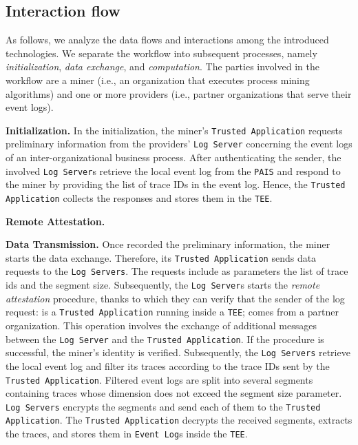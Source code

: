 \subsection{Interaction flow}
%

%
As follows, we analyze the data flows and interactions among the introduced technologies. We separate the workflow into subsequent processes, namely \textit{initialization}, \textit{data exchange}, and \textit{computation}.
The parties involved in the workflow are a miner (i.e., an organization that executes process mining algorithms) and one or more providers (i.e., partner organizations that serve their event logs). %

\textbf{Initialization.} In the initialization, the miner's \texttt{Trusted Application} requests preliminary information from the providers' \texttt{Log Server} concerning the event logs of an inter-organizational business process. After authenticating the sender, the involved \texttt{Log Server}s retrieve the local event log from the \texttt{PAIS} and respond to the miner by providing the list of trace IDs in the event log. Hence, the \texttt{Trusted Application} collects the responses and stores them in the \texttt{TEE}.

\textbf{Remote Attestation.} 

\textbf{Data Transmission.} Once recorded the preliminary information, the miner starts the data exchange. Therefore, its \texttt{Trusted Application} sends data requests to the \texttt{Log Servers}. The requests include as parameters the list of trace ids and the segment size. Subsequently, the \texttt{Log Server}s starts the \textit{remote attestation} procedure, thanks to which they can verify that the sender of the log request: is a \texttt{Trusted Application} running inside a \texttt{TEE}; comes from a partner organization. This operation involves the exchange of additional messages between the \texttt{Log Server} and the \texttt{Trusted Application}. If the procedure is successful, the miner's identity is verified.
Subsequently, the \texttt{Log Servers} retrieve the local event log and filter its traces according to the trace IDs sent by the \texttt{Trusted Application}. Filtered event logs are split into several segments containing traces whose dimension does not exceed the segment size parameter. \texttt{Log Servers} encrypts the segments and send each of them to the \texttt{Trusted Application}. The \texttt{Trusted Application} decrypts the received segments, extracts the traces, and stores them in \texttt{Event Log}s inside the \texttt{TEE}.


